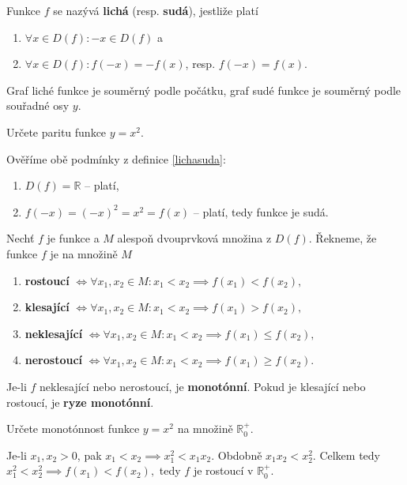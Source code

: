 \begin{definition}\label{lichasuda}
  Funkce $f$ se nazývá \textbf{lichá} (resp. \textbf{sudá}), jestliže platí
  \begin{enumerate}[$i.$]
    \item $\forall x \in D(f): -x \in D(f)$ a
  	\item $\forall x \in D(f): f(-x)=-f(x)$, resp. $f(-x)=f(x)$.
  \end{enumerate}
\end{definition}

\begin{pozn}
  Graf liché funkce je souměrný podle počátku, graf sudé funkce je souměrný podle souřadné osy $y$.
\end{pozn}

\begin{priklad}
Určete paritu funkce $y=x^2$.
\end{priklad}

\begin{reseni}
Ověříme obě podmínky z definice \ref{lichasuda}:
\begin{enumerate}[$i.$]
\item $D(f)=\mathbb R$ -- platí,
\item $f(-x)=(-x)^2=x^2=f(x)$ -- platí, tedy funkce je sudá.
\end{enumerate}
\end{reseni}

\begin{definition}
  Nechť $f$ je funkce a $M$ alespoň dvouprvková množina z $D(f)$. Řekneme, že funkce $f$ je na množině $M$
  \begin{enumerate}[$i.$]
    \item \textbf{rostoucí} $\iff \forall x_1, x_2 \in M: x_1 < x_2 \implies f(x_1) < f(x_2),$
    \item \textbf{klesající} $\iff \forall x_1, x_2 \in M: x_1 < x_2 \implies f(x_1) > f(x_2),$
    \item \textbf{neklesající} $\iff \forall x_1, x_2 \in M: x_1 < x_2 \implies f(x_1) \leq f(x_2),$
    \item \textbf{nerostoucí} $\iff \forall x_1, x_2 \in M: x_1 < x_2 \implies f(x_1) \geq f(x_2).$
  \end{enumerate}
  Je-li $f$ neklesající nebo nerostoucí, je \textbf{monotónní}. Pokud je klesající nebo rostoucí, je \textbf{ryze monotónní}.
\end{definition}

\begin{priklad}
Určete monotónnost funkce $y=x^2$ na množině $\mathbb R_0^+.$
\end{priklad}
\begin{reseni}
Je-li $x_1,x_2 >0$, pak $x_1 < x_2 \implies x_1^2 < x_1x_2.$ Obdobně $x_1x_2<x_2^2$.
Celkem tedy $x_1^2<x_2^2 \implies f(x_1)<f(x_2),$ tedy $f$ je rostoucí v $\mathbb R_0^+.$
\end{reseni}

